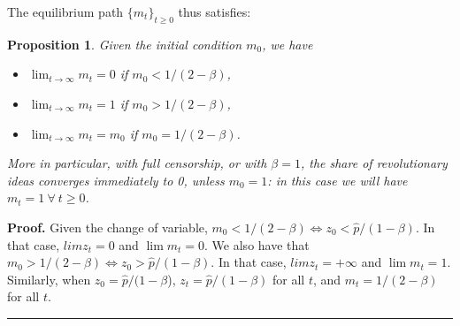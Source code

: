 \documentclass[12pt]{article}
\newtheorem{proposition}{Proposition}
\newenvironment{proof}[1][Proof]{\noindent \textbf{#1.} }{\  \rule{0.5em}{0.5em}}
\begin{document}
The equilibrium path $\{m_t\}_{t\geq0}$ thus satisfies:

\begin{proposition}
	Given the initial condition $m_0$, we have
	\begin{itemize}
    \item[i)]$\lim_{t\to\infty}m_t=0$ if $m_0<1/(2-\beta)$,
    \item[ii)] $\lim_{t\to\infty}m_t=1$ if $m_0>1/(2-\beta)$,
     \item[iii)]$\lim_{t\to\infty}m_t=m_0$ if $m_0=1/(2-\beta)$.
	\end{itemize}
    More in particular, with full censorship, or with $\beta=1$, the share of revolutionary ideas converges immediately to 0, unless $m_0=1$: in this case we will have $m_t=1 \ \forall \ t\geq0$.
	 \label{proposition:dynex}
\end{proposition}

\begin{proof}
Given the change of variable, $m_0<1/(2-\beta) \Leftrightarrow z_0<\hat{p}/(1-\beta)$. In that case, $lim z_t =0$ and $\lim m_t=0$. We also have that
$m_0>1/(2-\beta) \Leftrightarrow z_0>\hat{p}/(1-\beta)$. In that case, $lim z_t =+\infty$ and $\lim m_t=1$. Similarly, when $z_0=\hat{p}/(1-\beta$), $z_t=\hat{p}/(1-\beta)$ for all $t$, and $m_t=1/(2-\beta)$ for all $t$.
\end{proof}
\end{document}
